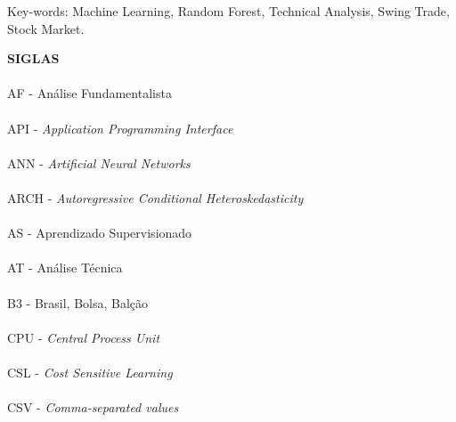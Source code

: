 \noindent Key-words: Machine Learning, Random Forest, Technical Analysis, Swing Trade, Stock Market.

\pagebreak


\begin{center}
\textbf{SIGLAS}
\end{center}

\paragraph{}AF - Análise Fundamentalista
\paragraph{}API - \textit{Application Programming Interface}
\paragraph{}ANN - \textit{Artificial Neural Networks}
\paragraph{}ARCH - \textit{Autoregressive Conditional Heteroskedasticity}
\paragraph{}AS - Aprendizado Supervisionado
\paragraph{}AT - Análise Técnica
\paragraph{}B3 - Brasil, Bolsa, Balção
\paragraph{}CPU - \textit{Central Process Unit}
\paragraph{}CSL - \textit{Cost Sensitive Learning}
\paragraph{}CSV - \textit{Comma-separated values}
